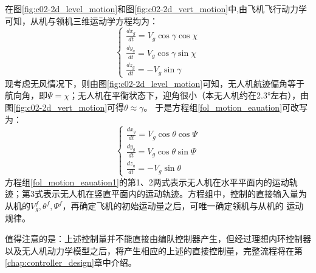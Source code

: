 在图\ref{fig:c02-2d_level_motion}和图\ref{fig:c02-2d_vert_motion}中,由飞机飞行动力学可知，从机与领机三维运动学方程均为：
\begin{equation}
    \left\{
    \begin{array}{l}
        \frac{dx_g}{dt}=V_g\cos\gamma\cos\chi\\
        \frac{dy_g}{dt}=V_g\cos\gamma\sin\chi\\
        \frac{dz_g}{dt}=-V_g\sin\gamma
    \end{array}
    \right .
    \label{fol_motion_eauation}
\end{equation}
现考虑无风情况下，则由图\ref{fig:c02-2d_level_motion}可知，无人机航迹偏角等于航向角，即$\Psi=\chi$；无人机在平衡状态下，迎角很小（本无人机约在2.3°左右），由图\ref{fig:c02-2d_vert_motion}可得$\theta\approx\gamma$。
于是方程组\ref{fol_motion_eauation}可改写为：
\begin{equation}
    \left\{
    \begin{array}{l}
        \frac{dx_g}{dt}=V_g\cos\theta\cos\Psi\\
        \frac{dy_g}{dt}=V_g\cos\theta\sin\Psi\\
        \frac{dz_g}{dt}=-V_g\sin\theta
    \end{array}
    \right .
    \label{fol_motion_eauation1}
\end{equation}
方程组\ref{fol_motion_eauation1}的第1、2两式表示无人机在水平平面内的运动轨迹；第3式表示无人机在竖直平面内的运动轨迹。方程组中，控制的直接输入量为从机的$V_{g}^f,\theta^f,\Psi^f$，再确定飞机的初始运动量之后，可唯一确定领机与从机的
运动规律。

值得注意的是：上述控制量并不能直接由编队控制器产生，但经过理想内环控制器以及无人机动力学模型之后，将产生相应的上述的直接控制量，完整流程将在第\ref{chap:controller_design}章中介绍。
